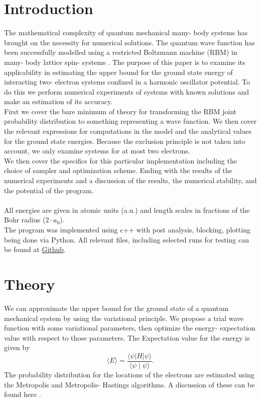 \documentclass[11pt,a4paper,titlepage]{article}
\begin{document}
\section{Introduction}
The mathematical complexity of quantum mechanical many- body systems has brought on the necessity for numerical solutions. The quantum wave function has been successfully modelled using a restricted Boltzmann machine (RBM) in many- body lattice spin- systems \cite{Carleo602}. The purpose of this paper is to examine its applicability in estimating the upper bound for the ground state energy of interacting two- electron systems confined in a harmonic oscillator potential. To do this we perform numerical experiments of systems with known solutions and make an estimation of its accuracy.\\First we cover the bare minimum of theory for transforming the RBM joint probability distribution to something representing a wave function. We then cover the relevant expressions for computations in the model and the analytical values for the ground state energies. Because the exclusion principle is not taken into account, we only examine systems for at most two electrons.\\ We then cover the specifics for this particular implementation including the choice of sampler and optimization scheme. Ending with the results of the numerical experiments and a discussion of the results, the numerical stability, and the potential of the program.\\\\All energies are given in atomic units (a.u.) and length scales in fractions of the Bohr radius ($2\cdot a_0$).\\The program was implemented using c++ with post analysis, blocking, plotting being done via Python. All relevant files, including selected runs for testing can be found at \href{https://github.com/adrian2208/QM_RBM/tree/main/QM_RBM}{Github}.

\section{Theory}
We can approximate the upper bound for the ground state of a quantum mechanical system by using the variational principle. We propose a trial wave function with some variational parameters, then optimize the energy- expectation value with respect to those parameters. The Expectation value for the energy is given by 
\begin{equation}
\langle E\rangle=\frac{\langle\psi|H| \psi\rangle}{\langle\psi \mid \psi\rangle}.
\end{equation}
The probability distribution for the locations of the electrons are estimated using the Metropolis and Metropolis- Hastings algorithms. A discussion of these can be found here \cite{Project1}.
\end{document}
